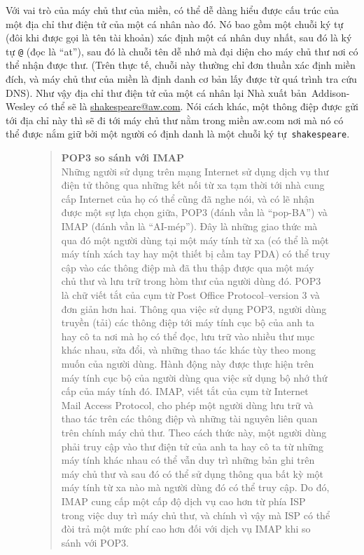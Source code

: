 Với vai trò của máy chủ thư của miền, có thể dễ dàng hiểu được cấu trúc của một địa chỉ
thư điện tử của một cá nhân nào đó. Nó bao gồm một chuỗi ký tự (đôi khi được gọi là tên
tài khoản) xác định một cá nhân duy nhất, sau đó là ký tự \texttt{@} (đọc là ``at''), sau
đó là chuỗi tên dễ nhớ mà đại diện cho máy chủ thư nơi có thể nhận được thư. (Trên thực
tế, chuỗi này thường chỉ đơn thuần xác định miền đích, và máy chủ thư của miền là định
danh cơ bản lấy được từ quá trình tra cứu DNS). Như vậy địa chỉ thư điện tử của một cá
nhân lại Nhà xuất bản~Addison-Wesley có thể sẽ là \url{shakespeare@aw.com}. Nói cách khác,
một thông điệp được gửi tới địa chỉ này thì sẽ đi tới máy chủ thư nằm trong miền aw.com
nơi mà nó có thể được nắm giữ bởi một người có định danh là một chuỗi ký
tự~\texttt{shakespeare}.

\begin{figure}[t]
  \begin{quotation}
    \noindent
    \textbf{POP3 so sánh với IMAP} \vspace{0.3cm}
    \\
    Những người sử dụng trên mạng Internet sử dụng dịch vụ thư điện tử thông qua những kết
    nối từ xa tạm thời tới nhà cung cấp Internet của họ có thể cũng đã nghe nói, và có lẽ
    nhận được một sự lựa chọn giữa, POP3 (đánh vần là ``pop-BA'') và IMAP (đánh vần là
    ``AI-mép''). Đây là những giao thức mà qua đó một người dùng tại một máy tính từ xa
    (có thể là một máy tính xách tay hay một thiết bị cầm tay PDA) có thể truy cập vào các
    thông điệp mà đã thu thập được qua một máy chủ thư và lưu trữ trong hòm thư của người
    dùng đó. POP3 là chữ viết tắt của cụm từ Post Office Protocol--version 3 và đơn giản
    hơn hai. Thông qua việc sử dụng POP3, người dùng truyền (tải) các thông điệp tới máy
    tính cục bộ của anh ta hay cô ta nơi mà họ có thể đọc, lưu trữ vào nhiều thư mục khác
    nhau, sửa đổi, và những thao tác khác tùy theo mong muốn của người dùng. Hành động này
    được thực hiện trên máy tính cục bộ của người dùng qua việc sử dụng bộ nhớ thứ cấp của
    máy tính đó. IMAP, viết tắt của cụm từ Internet Mail Access Protocol, cho phép một
    người dùng lưu trữ và thao tác trên các thông điệp và những tài nguyên liên quan trên
    chính máy chủ thư. Theo cách thức này, một người dùng phải truy cập vào thư điện tử
    của anh ta hay cô ta từ những máy tính khác nhau có thể vẫn duy trì những bản ghi trên
    máy chủ thư và sau đó có thể sử dụng thông qua bất kỳ một máy tính từ xa nào mà người
    dùng đó có thể truy cập. Do đó, IMAP cung cấp một cấp độ dịch vụ cao hơn từ phía ISP
    trong việc duy trì máy chủ thư, và chính vì vậy mà ISP có thể đòi trả một mức phí cao
    hơn đối với dịch vụ IMAP khi so sánh với POP3.
  \end{quotation}
\end{figure}

